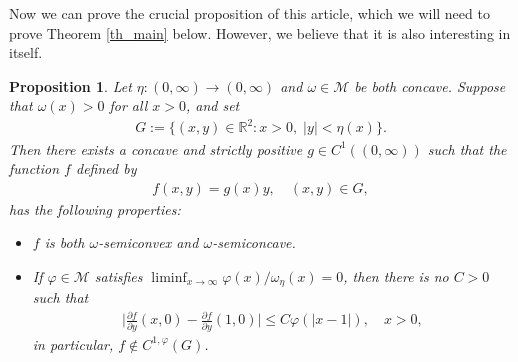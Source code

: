 \documentclass[10pt,a4paper]{amsart}
\newtheorem{proposition}[theorem]{Proposition}
\theoremstyle{definition}
\newcommand{\R}{\mathbb{R}}
\newcommand{\M}{\mathcal{M}}
\begin{document}
Now we can prove the crucial proposition of this article, which we will need to prove Theorem \ref{th_main} below. However, we believe that it is also interesting in itself.

\begin{proposition}\label{pr_main}
Let $ \eta:(0,\infty)\to(0,\infty) $ and $ \omega\in\M $ be both concave. Suppose that $ \omega(x)>0 $ for all $ x>0 $, and set
\begin{align*}
G:=\lbrace(x,y)\in\R^2:x>0,\;\vert y\vert<\eta(x)\rbrace .
\end{align*}
Then there exists a concave and strictly positive $ g\in C^1((0,\infty)) $ such that the function $ f $ defined by
\begin{align*}
f(x,y)=g(x)y,\quad (x,y)\in G,
\end{align*}
has the following properties:
\begin{itemize}
\item[(i)] $ f $ is both $ \omega $-semiconvex and $ \omega $-semiconcave.
\item[(ii)] If $ \varphi\in\M $ satisfies $ \liminf_{x\to\infty}\varphi(x)/\omega_{\eta}(x)=0 $, then there is no $ C>0 $ such that
\begin{align}\label{eq_varphi1}
\bigg\vert\frac{\partial f}{\partial y}(x,0)-\frac{\partial f}{\partial y}(1,0)\bigg\vert\leq C\varphi(\vert x-1\vert),\quad x>0,
\end{align}
in particular, $ f\notin C^{1,\varphi}(G) $.
\end{itemize}
\end{proposition}
\end{document}

